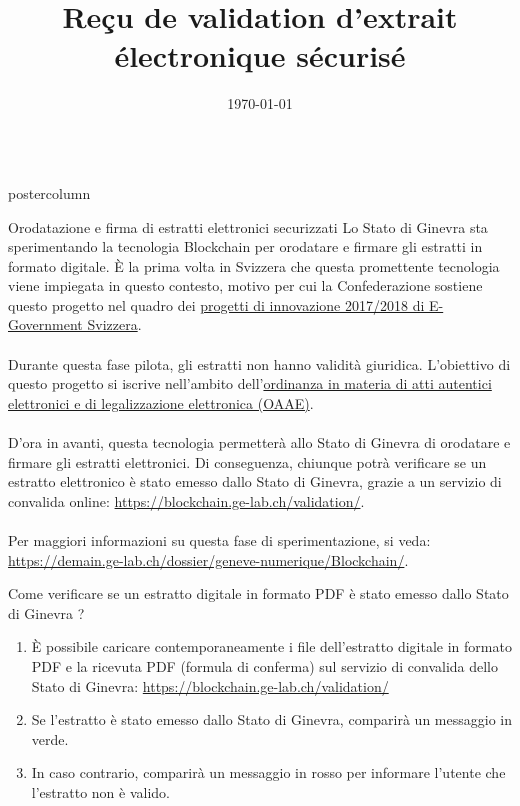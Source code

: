 \documentclass[roundedcorners=true, titleposition=center]{beamerthemeruhuisstijlposter}
\title{Reçu de validation d’extrait électronique sécurisé}
\date{\today}
\begin{document}
\begin{frame}
\begin{columns}
\begin{column}{0.95\textwidth}
\begin{beamercolorbox}[center, wd=\textwidth]{postercolumn}
\begin{minipage}[T]{0.95\textwidth}
\parbox[t][\columnheight]{\textwidth}{%
\begin{block}{Orodatazione e firma di estratti elettronici securizzati}
Lo Stato di Ginevra sta sperimentando la tecnologia Blockchain per orodatare e firmare gli estratti in formato digitale. È la prima volta in Svizzera che questa promettente tecnologia viene impiegata in questo contesto, motivo per cui la Confederazione sostiene questo progetto nel quadro dei \href{https://www.egovernment.ch/fr/umsetzung/innovationen/innovations-20172018/}{progetti di innovazione 2017/2018 di E-Government Svizzera}.
\\
\\
Durante questa fase pilota, gli estratti non hanno validità giuridica. L’obiettivo di questo progetto si iscrive nell’ambito dell’\href{https://www.admin.ch/opc/fr/classified-compilation/20111505/201701010000/943.033.pdf}{ordinanza in materia di atti autentici elettronici e di legalizzazione elettronica (OAAE)}.
\\
\\
D’ora in avanti, questa tecnologia permetterà allo Stato di Ginevra di orodatare e firmare gli estratti elettronici. Di conseguenza, chiunque potrà verificare se un estratto elettronico è stato emesso dallo Stato di Ginevra, grazie a un servizio di convalida online: \href{https://blockchain.ge-lab.ch/validation/}{https://blockchain.ge-lab.ch/validation/}.
\\
\\
Per maggiori informazioni su questa fase di sperimentazione, si veda: \href{https://demain.ge-lab.ch/dossier/geneve-numerique/Blockchain/}{https://demain.ge-lab.ch/dossier/geneve-numerique/Blockchain/}.
\end{block}
\medskip
\begin{block}{Come verificare se un estratto digitale in formato PDF è stato emesso dallo Stato di Ginevra ?}
\begin{enumerate}
\item È possibile caricare contemporaneamente i file dell’estratto digitale in formato PDF e la ricevuta PDF (formula di conferma) sul servizio di convalida dello Stato di Ginevra: \href{https://blockchain.ge-lab.ch/validation/}{https://blockchain.ge-lab.ch/validation/}
\item Se l’estratto è stato emesso dallo Stato di Ginevra, comparirà un messaggio in verde.
\item In caso contrario, comparirà un messaggio in rosso per informare l’utente che l’estratto non è valido.
\end{enumerate}
\end{block}
}
\end{minipage}
\end{beamercolorbox}
\end{column}
\end{columns}
\end{frame}
\end{document}
